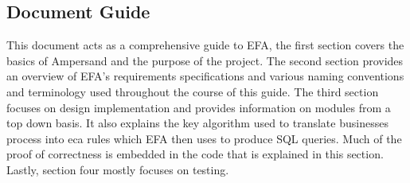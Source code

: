 \documentclass[journal,12pt,onecolumn,draftclsnofoot]{article}
\let\Oldsubsection\subsection
\renewcommand{\subsection}{\FloatBarrier\Oldsubsection}
\begin{document}
\subsection{Document Guide}
This document acts as a comprehensive guide to EFA, the first section covers 
the basics of Ampersand and the purpose of the project. The second section 
provides an overview of EFA's requirements specifications and various naming 
conventions and terminology used throughout the course of this guide. The third 
section focuses on design implementation and provides information on modules 
from a top down basis. It also explains the key algorithm used to translate 
businesses process into eca rules which EFA then uses to produce SQL queries. 
Much of the proof of correctness is embedded in the code that is explained in 
this section. Lastly, section four mostly focuses on testing. 


\end{document}
